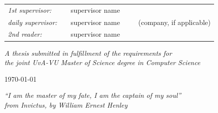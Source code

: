 \documentclass[openany,11pt]{Latex/classes/PhDthesisPSnPDF}
\begin{document}
\begin{center}
		\vspace*{2cm}
		
		\begin{tabular}{ll}
			{\it 1st supervisor:}   & ~~supervisor name \\
			{\it daily supervisor:} & ~~supervisor name ~~~~ (company, if applicable) \\
			{\it 2nd reader:}       & ~~supervisor name
		\end{tabular}
		
		\vspace*{2.5cm}
		
		\textit{A thesis submitted in fulfillment of the requirements for\\ the joint UvA-VU Master of Science degree in Computer Science}
		
		\vspace*{1.8cm}
		
		\today\\[4cm] %
		
	\end{center}
	
	\newpage
	
	
	
	\hfuzz=50pt

	
	
	\begin{center}
		\textit{``I am the master of my fate, I am the captain of my soul'' \\ from {\em Invictus}, by William Ernest Henley}
	\end{center}
	
	
	\newpage
	
\end{document}
